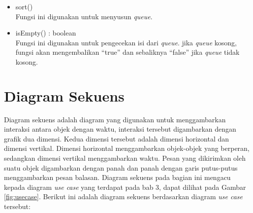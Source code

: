 \begin{itemize}
\begin{itemize}
\begin{itemize}
      \item sort()\\
      Fungsi ini digunakan untuk menyusun \textit{queue}.
      
      \item isEmpty() : boolean\\
      Fungsi ini digunakan untuk pengecekan isi dari \textit{queue}. jika
      \textit{queue} kosong, fungsi akan mengembalikan ``true'' dan sebaliknya
      ``false'' jika \textit{queue} tidak kosong.
    \end{itemize}
  \end{itemize}
\end{itemize}

\section{Diagram Sekuens}
Diagram sekuens adalah diagram yang digunakan untuk menggambarkan interaksi
antara objek dengan waktu, interaksi tersebut digambarkan dengan grafik dua
dimensi. Kedua dimensi tersebut adalah dimensi horizontal dan dimensi vertikal.
Dimensi horizontal menggambarkan objek-objek yang berperan, sedangkan dimensi
vertikal menggambarkan waktu. Pesan yang dikirimkan oleh suatu objek digambarkan
dengan panah dan panah dengan garis putus-putus menggambarkan pesan balasan.
Diagram sekuens pada bagian ini mengacu kepada diagram \textit{use case} yang
terdapat pada bab 3, dapat dilihat pada Gambar \ref{fig:usecase}. Berikut ini
adalah diagram sekuens berdasarkan diagram \textit{use case} tersebut:
